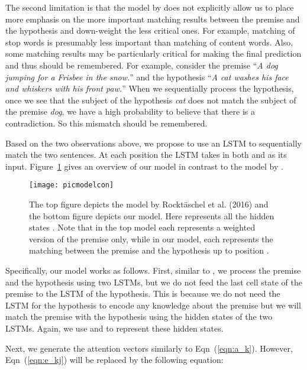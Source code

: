 \documentclass[11pt,letterpaper]{article}
\begin{document}
The second limitation is that the model by  does not explicitly allow us to place more emphasis on the more important matching results between the premise and the hypothesis and down-weight the less critical ones.
For example, matching of stop words is presumably less important than matching of content words.
Also, some matching results may be particularly critical for making the final prediction and thus should be remembered.
For example, consider the premise ``\emph{A dog jumping for a Frisbee in the snow.}'' and the hypothesis ``\emph{A cat washes his face and whiskers with his front paw.}''
When we sequentially process the hypothesis, once we see that the subject of the hypothesis \emph{cat} does not match the subject of the premise \emph{dog}, we have a high probability to believe that there is a contradiction.
So this mismatch should be remembered.

Based on the two observations above, we propose to use an LSTM to sequentially match the two sentences.
At each position the LSTM takes in both  and  as its input.
Figure~\ref{fig:model} gives an overview of our model in contrast to the model by .

\begin{figure}[t]
\begin{center}
\texttt{[image: picmodelcon]}
\end{center}
\caption{The top figure depicts the model by Rockt{\"a}schel et al. (2016)
and the bottom figure depicts our model.
Here  represents all the hidden states .
Note that in the top model 
each  represents a weighted version of the premise only, while in our model, each  represents the matching between the premise and the hypothesis up to position .}
\label{fig:model}
\end{figure}

Specifically, our model works as follows.
First, similar to , we process the premise and the hypothesis using two LSTMs, but we do not feed the last cell state of the premise to the LSTM of the hypothesis.
This is because we do not need the LSTM for the hypothesis to encode any knowledge about the premise but we will match the premise with the hypothesis using the hidden states of the two LSTMs.
Again, we use  and  to represent these hidden states.

Next, we generate the attention vectors  similarly to Eqn~(\ref{eqn:a_k}).
However, Eqn~(\ref{eqn:e_kj}) will be replaced by the following equation:
\end{document}
